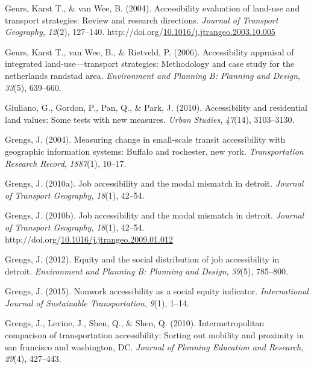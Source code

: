 \documentclass[
11pt, %
oneside, %
english, %
singlespacing, %
]{macthesis} %
\newlength{\cslhangindent}
\newenvironment{CSLReferences}[2] %
{\begin{list}{}{%
	\setlength{\itemindent}{0pt}
	\setlength{\leftmargin}{0pt}
	\setlength{\parsep}{0pt}
	\ifodd #1
	\setlength{\leftmargin}{\cslhangindent}
	\setlength{\itemindent}{-1\cslhangindent}
	\fi
	\setlength{\itemsep}{#2\baselineskip}}}
{\end{list}}
\begin{document}
\begin{CSLReferences}{1}{0}
Geurs, Karst T., \& van Wee, B. (2004). Accessibility evaluation of land-use and transport strategies: Review and research directions. \emph{Journal of Transport Geography}, \emph{12}(2), 127--140. http://doi.org/\href{https://doi.org/10.1016/j.jtrangeo.2003.10.005}{10.1016/j.jtrangeo.2003.10.005}

Geurs, Karst T., van Wee, B., \& Rietveld, P. (2006). Accessibility appraisal of integrated land-use---transport strategies: Methodology and case study for the netherlands randstad area. \emph{Environment and Planning B: Planning and Design}, \emph{33}(5), 639--660.

Giuliano, G., Gordon, P., Pan, Q., \& Park, J. (2010). Accessibility and residential land values: Some tests with new measures. \emph{Urban Studies}, \emph{47}(14), 3103--3130.

Grengs, J. (2004). Measuring change in small-scale transit accessibility with geographic information systems: Buffalo and rochester, new york. \emph{Transportation Research Record}, \emph{1887}(1), 10--17.

Grengs, J. (2010a). Job accessibility and the modal mismatch in detroit. \emph{Journal of Transport Geography}, \emph{18}(1), 42--54.

Grengs, J. (2010b). Job accessibility and the modal mismatch in detroit. \emph{Journal of Transport Geography}, \emph{18}(1), 42--54. http://doi.org/\href{https://doi.org/10.1016/j.jtrangeo.2009.01.012}{10.1016/j.jtrangeo.2009.01.012}

Grengs, J. (2012). Equity and the social distribution of job accessibility in detroit. \emph{Environment and Planning B: Planning and Design}, \emph{39}(5), 785--800.

Grengs, J. (2015). Nonwork accessibility as a social equity indicator. \emph{International Journal of Sustainable Transportation}, \emph{9}(1), 1--14.

Grengs, J., Levine, J., Shen, Q., \& Shen, Q. (2010). Intermetropolitan comparison of transportation accessibility: Sorting out mobility and proximity in san francisco and washington, DC. \emph{Journal of Planning Education and Research}, \emph{29}(4), 427--443.


\end{CSLReferences}
\end{document}

